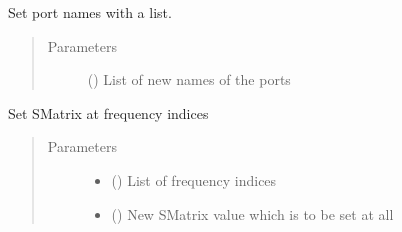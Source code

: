 \documentclass[letterpaper,10pt,english]{sphinxmanual}
\begin{document}
\begin{fulllineitems}

\begin{fulllineitems}
\label{\detokenize{touchstone:touchstone.spfile.set_port_names}}
Set port names with a list.
\begin{quote}\begin{description}
\item[{Parameters}] \leavevmode
{} () \textendash{} List of new names of the ports

\end{description}\end{quote}

\end{fulllineitems}


\begin{fulllineitems}
\label{\detokenize{touchstone:touchstone.spfile.set_smatrix_at_frequency_point}}
Set S\sphinxhyphen{}Matrix at frequency indices
\begin{quote}\begin{description}
\item[{Parameters}] \leavevmode\begin{itemize}
\item {} 
 () \textendash{} List of frequency indices

\item {} 
 () \textendash{} New S\sphinxhyphen{}Matrix value which is to be set at all 

\end{itemize}

\end{description}\end{quote}


\end{fulllineitems}
\end{fulllineitems}
\end{document}
